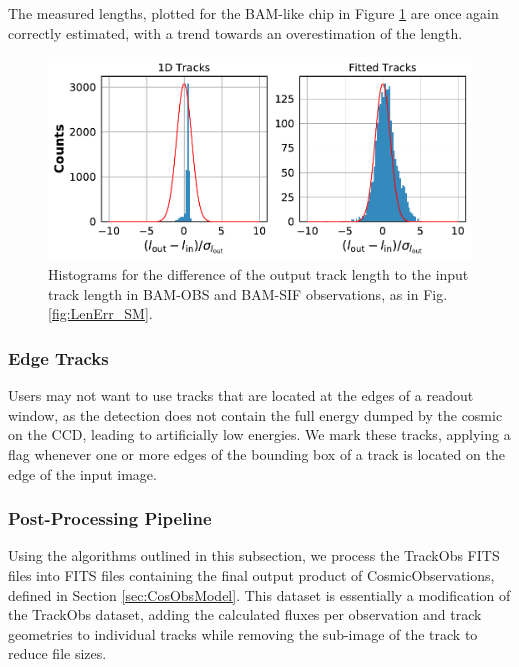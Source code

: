 \documentclass[a4paper, 11pt]{article}
\begin{document}
The measured lengths, plotted for the BAM-like chip in Figure \ref{fig:LenErr_BAM} are once again correctly estimated, with a trend towards an overestimation of the length.

\begin{figure}[!h]
  \centering
  \includegraphics[width=\textwidth]{images/postprocessing/LenErr_BAM}
  \caption{Histograms for the difference of the output track length to the input track length in BAM-OBS and BAM-SIF observations, as in Fig. \ref{fig:LenErr_SM}.}
  \label{fig:LenErr_BAM}
\end{figure}




\subsubsection{Edge Tracks}
\label{sec:edge_tracks}

Users may not want to use tracks that are located at the edges of a readout window, as the detection does not contain the full energy dumped by the cosmic on the CCD, leading to artificially low energies.  We mark these tracks, applying a flag whenever one or more edges of the bounding box of a track is located on the edge of the input image.


\subsubsection{Post-Processing Pipeline}

Using the algorithms outlined in this subsection, we process the TrackObs FITS files into FITS files containing the final output product of CosmicObservations, defined in Section \ref{sec:CosObsModel}. This dataset is essentially a modification of the TrackObs dataset, adding the calculated fluxes per observation and track geometries to individual tracks while removing the sub-image of the track to reduce file sizes.
\end{document}
